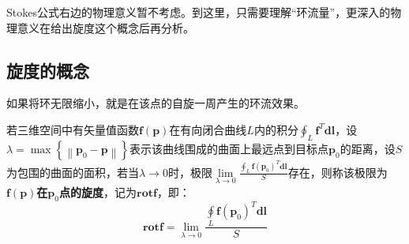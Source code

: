 \begin{tcolorbox}
Stokes公式右边的物理意义暂不考虑。到这里，只需要理解“环流量”，更深入的物理意义在给出旋度这个概念后再分析。
\end{tcolorbox}

\subsection{旋度的概念}

如果将环无限缩小，就是在该点的自旋一周产生的环流效果。

\begin{definition}[旋度]
若三维空间中有矢量值函数$\boldsymbol{f}\left( \boldsymbol{p} \right) $在有向闭合曲线$L$内的积分$\oint_L{\boldsymbol{f}^T\boldsymbol{dl}}$，设$\lambda =\max \left\{ \left\| \boldsymbol{p}_0-\boldsymbol{p} \right\| \right\} $表示该曲线围成的曲面上最远点到目标点$\boldsymbol{p}_0$的距离，设$S$为包围的曲面的面积，若当$\lambda \rightarrow 0$时，极限$\underset{\lambda \rightarrow 0}{\lim}\frac{\oint_L{\boldsymbol{f}\left( \boldsymbol{p}_0 \right) ^T\boldsymbol{dl}}}{S}$存在，则称该极限为{\bf $\boldsymbol{f}\left( \boldsymbol{p} \right) $在$\boldsymbol{p}_0$点的旋度}，记为$\mathbf{rot}\boldsymbol{f}$，即：
\[
\mathbf{rot}\boldsymbol{f}=\underset{\lambda \rightarrow 0}{\lim}\frac{\oint\limits_L{\boldsymbol{f}\left( \boldsymbol{p}_0 \right) ^T\boldsymbol{dl}}}{S}
\]
\end{definition}

